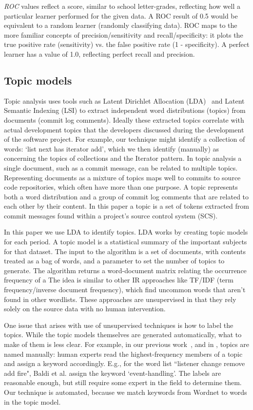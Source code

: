\documentclass[10pt, conference, compsocconf]{IEEEtran}
\begin{document}
\emph{ROC} values reflect a score, similar to school letter-grades, reflecting how well a particular learner performed for the given data. A ROC result of 0.5 would be equivalent to a random learner (randomly classifying data). ROC maps to the more familiar concepts of precision/sensitivity and recall/specificity: it plots the true positive rate (sensitivity) vs. the false positive rate (1 - specificity). A perfect learner has a value of 1.0, reflecting perfect recall and precision.

\subsection{Topic models}
Topic analysis uses tools such as Latent Dirichlet Allocation (LDA)~\cite{Blei2003} and Latent Semantic Indexing (LSI) to extract
independent word distributions (topics) from
	documents (commit log comments). %
Ideally these extracted topics 
correlate with actual development topics that the developers discussed
during the development of the software project. For example, our technique might identify a collection of words: `list next has iterator add', which we then identify (manually) as concerning the topics of collections and the Iterator pattern.
In topic analysis a single document, such as a commit message, can be related to multiple topics. Representing documents as a mixture of topics maps well to commits to source code repositories, which often have more than one purpose.  A topic
represents both a word distribution and a group of commit log comments
that are related to each other by their content.  In this paper a topic
is a set of tokens extracted from commit messages found within a
project's source control system (SCS).

In this paper we use LDA to identify topics.  LDA works by creating topic models for each period. A topic model is a statistical summary of the important subjects for that dataset.  The input to the algorithm is a set of documents, with contents treated as a bag of words, and a parameter to set the number of topics to generate. The algorithm returns a word-document matrix relating the occurrence frequency of a 
 The idea is similar to other IR approaches like TF/IDF (term frequency/inverse document frequency), which find uncommon words that aren't found in other wordlists. These approaches are unsupervised in that they rely solely on the source data with no human intervention.

One issue that arises with use of unsupervised techniques is how to label the topics. While the topic models themselves are generated automatically, what to make of them is less clear. For example, in our previous work~\cite{Hindle09ICSM}, and in \cite{Baldi2008}, topics are named manually: human experts read the highest-frequency members of a topic and assign a keyword accordingly. E.g., for the word list ``listener change remove add fire", Baldi et al. assign the keyword `event-handling'. The labels are reasonable enough, but still require some expert in the field to determine them. Our technique is automated, because we match keywords from Wordnet to words in the topic model. 
\end{document}
